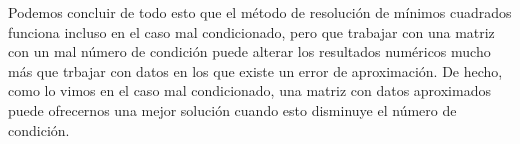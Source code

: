 \documentclass{article}
\begin{document}
\begin{enumerate}
\begin{enumerate}
        Podemos concluir de todo esto que el método de resolución de mínimos cuadrados funciona incluso en el caso mal condicionado,
        pero que trabajar con una matriz con un mal número de condición puede alterar los resultados numéricos mucho más que trbajar 
        con datos en los que existe un error de aproximación. De hecho, como lo vimos en el caso mal condicionado, una matriz con datos
        aproximados puede ofrecernos una mejor solución cuando esto disminuye el número de condición.

    \end{enumerate}



   
\end{enumerate}




 
\end{document}
